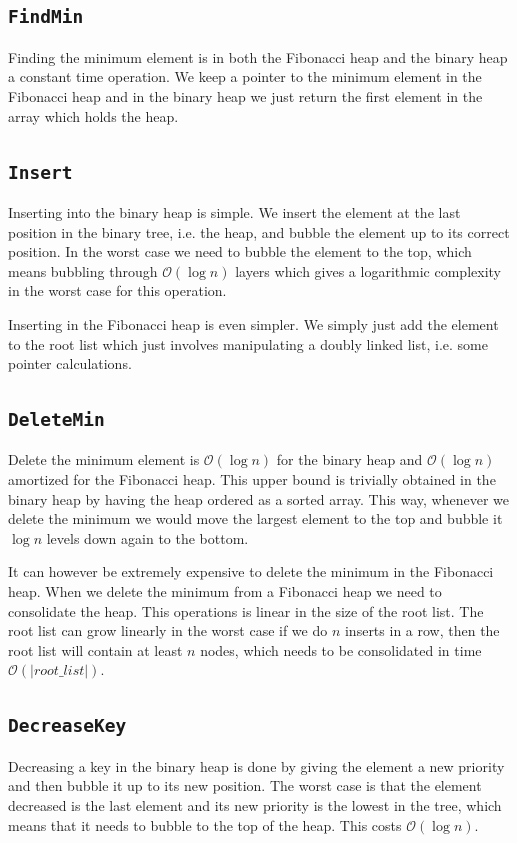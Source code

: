 \documentclass[a4paper,oneside,article,11pt]{memoir}
\begin{document}
\subsection{\texttt{FindMin}}
Finding the minimum element is in both the Fibonacci heap and the binary heap a constant time operation. We keep a pointer to the minimum element in the Fibonacci heap and in the binary heap we just return the first element in the array which holds the heap.

\subsection{\texttt{Insert}}
Inserting into the binary heap is simple. We insert the element at the last position in the binary tree, i.e. the heap, and bubble the element up to its correct position. In the worst case we need to bubble the element to the top, which means bubbling through $\mathcal{O}(\log n)$ layers which gives a logarithmic complexity in the worst case for this operation.

Inserting in the Fibonacci heap is even simpler. We simply just add the element to the root list which just involves manipulating a doubly linked list, i.e. some pointer calculations. 

\subsection{\texttt{DeleteMin}}
Delete the minimum element is $\mathcal{O}(\log{n})$ for the binary heap and $\mathcal{O}(\log{n})$ amortized for the Fibonacci heap. This upper bound is trivially obtained in the binary heap by having the heap ordered as a sorted array. This way, whenever we delete the minimum we would move the largest element to the top and bubble it $\log n$ levels down again to the bottom.

It can however be extremely expensive to delete the minimum in the Fibonacci heap. When we delete the minimum from a Fibonacci heap we need to consolidate the heap. This operations is linear in the size of the root list. The root list can grow linearly in the worst case if we do $n$ inserts in a row, then the root list will contain at least $n$ nodes, which needs to be consolidated in time $\mathcal{O}(\vert root\_list \vert)$.

\subsection{\texttt{DecreaseKey}}
Decreasing a key in the binary heap is done by giving the element a new priority and then bubble it up to its new position. The worst case is that the element decreased is the last element and its new priority is the lowest in the tree, which means that it needs to bubble to the top of the heap. This costs $\mathcal{O}(\log n)$.
\end{document}
